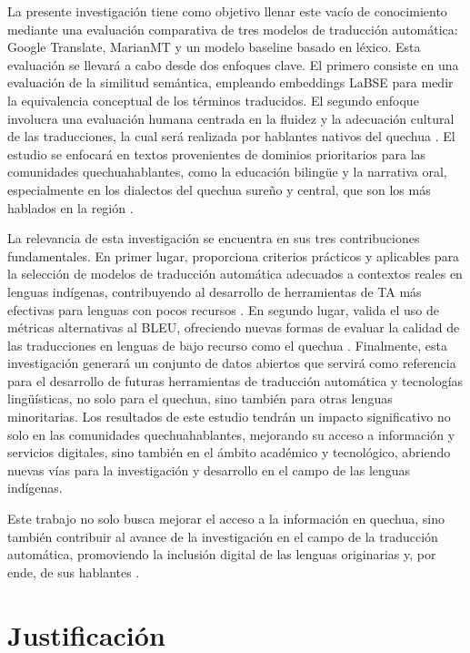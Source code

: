 La presente investigación tiene como objetivo llenar este vacío de conocimiento mediante una evaluación comparativa de tres modelos de traducción automática: Google Translate, MarianMT y un modelo baseline basado en léxico. Esta evaluación se llevará a cabo desde dos enfoques clave. El primero consiste en una evaluación de la similitud semántica, empleando embeddings LaBSE \cite{feng2022} para medir la equivalencia conceptual de los términos traducidos. El segundo enfoque involucra una evaluación humana centrada en la fluidez y la adecuación cultural de las traducciones, la cual será realizada por hablantes nativos del quechua \cite{bird2020}. El estudio se enfocará en textos provenientes de dominios prioritarios para las comunidades quechuahablantes, como la educación bilingüe y la narrativa oral, especialmente en los dialectos del quechua sureño y central, que son los más hablados en la región \cite{adelaar2004}.

La relevancia de esta investigación se encuentra en sus tres contribuciones fundamentales. En primer lugar, proporciona criterios prácticos y aplicables para la selección de modelos de traducción automática adecuados a contextos reales en lenguas indígenas, contribuyendo al desarrollo de herramientas de TA más efectivas para lenguas con pocos recursos \cite{neubig2018rapid}. En segundo lugar, valida el uso de métricas alternativas al BLEU, ofreciendo nuevas formas de evaluar la calidad de las traducciones en lenguas de bajo recurso como el quechua \cite{feng2022}. Finalmente, esta investigación generará un conjunto de datos abiertos que servirá como referencia para el desarrollo de futuras herramientas de traducción automática y tecnologías lingüísticas, no solo para el quechua, sino también para otras lenguas minoritarias\cite{zevallos2022}. Los resultados de este estudio tendrán un impacto significativo no solo en las comunidades quechuahablantes, mejorando su acceso a información y servicios digitales, sino también en el ámbito académico y tecnológico, abriendo nuevas vías para la investigación y desarrollo en el campo de las lenguas indígenas.

Este trabajo no solo busca mejorar el acceso a la información en quechua, sino también contribuir al avance de la investigación en el campo de la traducción automática, promoviendo la inclusión digital de las lenguas originarias y, por ende, de sus hablantes \cite{bird2020}.

\section{Justificación}

